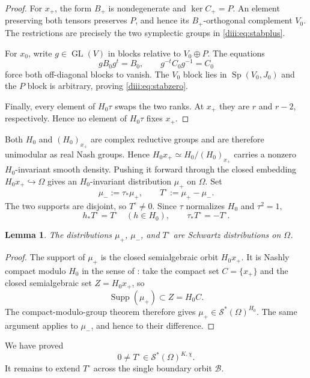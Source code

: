 \documentclass[11pt,reqno]{amsart}
\numberwithin{equation}{section}
\newtheorem{lemma}[theorem]{Lemma}
\theoremstyle{definition}
\theoremstyle{remark}
\newcommand{\GL}{\operatorname{GL}}
\newcommand{\Sp}{\operatorname{Sp}}
\newcommand{\Supp}{\operatorname{Supp}}
\newcommand{\cS}{\mathcal S}
\begin{document}
\begin{proof}
For $x_+$, the form $B_+$ is nondegenerate and $\ker C_+=P$.  An element preserving both tensors preserves $P$, and hence its $B_+$-orthogonal complement $V_0$.  The restrictions are precisely the two symplectic groups in \eqref{diii:eq:stabplus}.

For $x_0$, write $g\in\GL(V)$ in blocks relative to $V_0\oplus P$.
The equations
\[
  gB_0g^t=B_0,
  \qquad
  g^{-t}C_0g^{-1}=C_0
\]
force both off-diagonal blocks to vanish.  The $V_0$ block lies in
$\Sp(V_0,J_0)$ and the $P$ block is arbitrary, proving \eqref{diii:eq:stabzero}.

Finally, every element of $H_0\tau$ swaps the two ranks.  At $x_+$ they are
$r$ and $r-2$, respectively.  Hence no element of $H_0\tau$ fixes $x_+$.
\end{proof}

Both $H_0$ and $(H_0)_{x_+}$ are complex reductive groups and are therefore unimodular as real Nash groups.  Hence
$H_0x_+\simeq H_0/(H_0)_{x_+}$ carries a nonzero $H_0$-invariant smooth density.  Pushing it forward through the closed embedding
$H_0x_+\hookrightarrow\Omega$ gives an $H_0$-invariant distribution $\mu_+$ on $\Omega$.  Set
\[
  \mu_-:=\tau_*\mu_+,
  \qquad
  T^\circ:=\mu_+-\mu_-.
\]
The two supports are disjoint, so $T^\circ\ne0$.  Since $\tau$ normalizes $H_0$ and $\tau^2=1$,
\begin{equation}\label{diii:eq:Topen-equiv}
  h_*T^\circ=T^\circ\quad(h\in H_0),
  \qquad
  \tau_*T^\circ=-T^\circ.
\end{equation}

\begin{lemma}\label{diii:lem:orbital-schwartz}
The distributions $\mu_+$, $\mu_-$, and $T^\circ$ are Schwartz distributions on $\Omega$.
\end{lemma}

\begin{proof}
The support of $\mu_+$ is the closed semialgebraic orbit $H_0x_+$.  It is Nashly compact modulo $H_0$ in the sense of \cite[Definition~4.0.3]{AG09}: take the compact set $C=\{x_+\}$ and the closed semialgebraic set
$Z=H_0x_+$, so
\[
  \Supp(\mu_+)\subset Z=H_0C.
\]
The compact-modulo-group theorem \cite[Theorem~B.4.1]{AG09} therefore gives
$\mu_+\in\cS^*(\Omega)^{H_0}$.  The same argument applies to $\mu_-$, and hence to their difference.
\end{proof}

We have proved
\begin{equation}\label{diii:eq:Topen}
  0\ne T^\circ\in\cS^*(\Omega)^{K,\chi}.
\end{equation}
It remains to extend $T^\circ$ across the single boundary orbit $\mathcal B$.
\end{document}
